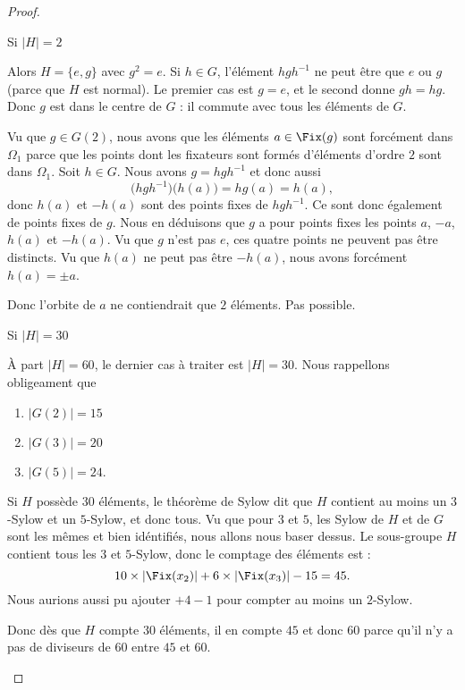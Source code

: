 \begin{proof}
\begin{subproof}
            \item[Si \( | H |=2\)]

                Alors \( H=\{ e,g \}\) avec \( g^2=e\). Si \( h\in G\), l'élément \( hgh^{-1}\) ne peut être que \( e\) ou \( g\) (parce que \( H\) est normal). Le premier cas est \( g=e\), et le second donne \( gh=hg\). Donc \( g\) est dans le centre de \( G\) : il commute avec tous les éléments de \( G\).

                Vu que \( g\in G(2)\), nous avons que les éléments \( a\in\Fix(g)\) sont forcément dans \( \Omega_1\) parce que les points dont les fixateurs sont formés d'éléments d'ordre \( 2\) sont dans \( \Omega_1\). Soit \( h\in G\). Nous avons \( g=hgh^{-1}\) et donc aussi
                \begin{equation}
                    \big( hgh^{-1} \big)\big( h(a) \big)=hg(a)=h(a),
                \end{equation}
                donc \( h(a)\) et \( -h(a)\) sont des points fixes de \( hgh^{-1}\). Ce sont donc également de points fixes de \( g\). Nous en déduisons que \( g\) a pour points fixes les points \( a\), \( -a\), \( h(a)\) et \( -h(a)\). Vu que \( g\) n'est pas \( e\), ces quatre points ne peuvent pas être distincts. Vu que \( h(a)\) ne peut pas être \( -h(a)\), nous avons forcément \( h(a)=\pm a\).

                Donc l'orbite de \( a\) ne contiendrait que \( 2\) éléments. Pas possible.

            \item[Si \( | H |=30\)]

               À part \( | H |=60\), le dernier cas à traiter est \( | H |=30\). Nous rappellons obligeament que
               \begin{enumerate}
                   \item
                       \( | G(2) |=15\)
                   \item
                       \( | G(3) |=20\)
                   \item
                       \( | G(5) |=24\).
               \end{enumerate}
               Si \( H\) possède \( 30\) éléments, le théorème de Sylow dit que \( H\) contient au moins un \( 3\)-Sylow et un \( 5\)-Sylow, et donc tous. Vu que pour \( 3\) et \( 5\), les Sylow de \( H\) et de \( G\) sont les mêmes et bien idéntifiés, nous allons nous baser dessus. Le sous-groupe \( H\) contient tous les \( 3\) et \( 5\)-Sylow, donc le comptage des éléments est :
                \begin{equation}
                    10\times | \Fix(x_2) |+6\times | \Fix(x_3) |-15=45.
                \end{equation}
                Nous aurions aussi pu ajouter \( +4-1\) pour compter au moins un \( 2\)-Sylow.

                Donc dès que \( H\) compte \( 30\) éléments, il en compte \( 45\) et donc \( 60\) parce qu'il n'y a pas de diviseurs de \( 60\) entre \( 45\) et \( 60\).

    \end{subproof}

\end{proof}

